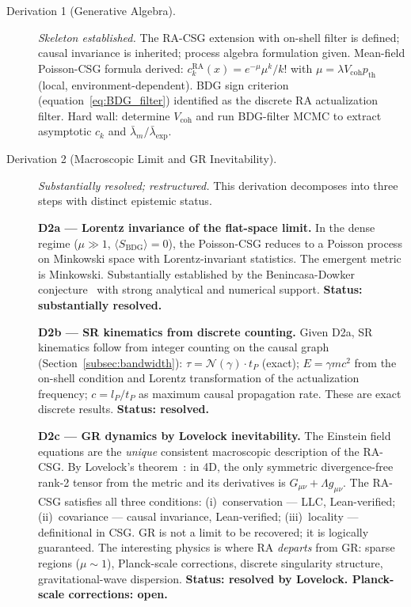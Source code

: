 \documentclass[11pt,a4paper]{article}
\theoremstyle{plain}
\theoremstyle{definition}
\theoremstyle{remark}
\begin{document}
\begin{description}
  \item[Derivation 1 (Generative Algebra).] \textit{Skeleton established.} The
  RA-CSG extension with on-shell filter is defined; causal invariance is inherited;
  process algebra formulation given. Mean-field Poisson-CSG formula derived:
  $c_k^{\mathrm{RA}}(x) = e^{-\mu}\mu^k/k!$ with $\mu = \lambda V_{\mathrm{coh}}
  p_{\mathrm{th}}$ (local, environment-dependent). BDG sign criterion
  (equation~\eqref{eq:BDG_filter}) identified as the discrete RA actualization
  filter. Hard wall: determine $V_{\mathrm{coh}}$ and run BDG-filter MCMC to
  extract asymptotic $c_k$ and $\bar\lambda_m/\bar\lambda_{\mathrm{exp}}$.

  \item[Derivation 2 (Macroscopic Limit and GR Inevitability).]
  \textit{Substantially resolved; restructured.} This derivation decomposes
  into three steps with distinct epistemic status.

  \textbf{D2a --- Lorentz invariance of the flat-space limit.} In the dense
  regime ($\mu \gg 1$, $\langle S_{\mathrm{BDG}}\rangle = 0$), the Poisson-CSG
  reduces to a Poisson process on Minkowski space with Lorentz-invariant
  statistics. The emergent metric is Minkowski. Substantially established by
  the Benincasa-Dowker conjecture~\citep{Benincasa2010} with strong analytical
  and numerical support. \textbf{Status: substantially resolved.}

  \textbf{D2b --- SR kinematics from discrete counting.} Given D2a, SR
  kinematics follow from integer counting on the causal graph
  (Section~\ref{subsec:bandwidth}): $\tau = \mathcal{N}(\gamma)\cdot t_P$
  (exact); $E = \gamma mc^2$ from the on-shell condition and Lorentz
  transformation of the actualization frequency; $c = l_P/t_P$ as maximum
  causal propagation rate. These are exact discrete results.
  \textbf{Status: resolved.}

  \textbf{D2c --- GR dynamics by Lovelock inevitability.} The Einstein
  field equations are the \emph{unique} consistent macroscopic description
  of the RA-CSG. By Lovelock's theorem~\citep{Lovelock1971}: in 4D, the
  only symmetric divergence-free rank-2 tensor from the metric and its
  derivatives is $G_{\mu\nu} + \Lambda g_{\mu\nu}$. The RA-CSG satisfies all
  three conditions: (i)~conservation --- LLC, Lean-verified; (ii)~covariance
  --- causal invariance, Lean-verified; (iii)~locality --- definitional in CSG.
  GR is not a limit to be recovered; it is logically guaranteed. The
  interesting physics is where RA \emph{departs} from GR: sparse regions
  ($\mu \sim 1$), Planck-scale corrections, discrete singularity structure,
  gravitational-wave dispersion. \textbf{Status: resolved by Lovelock.
  Planck-scale corrections: open.}


\end{description}
\end{document}
